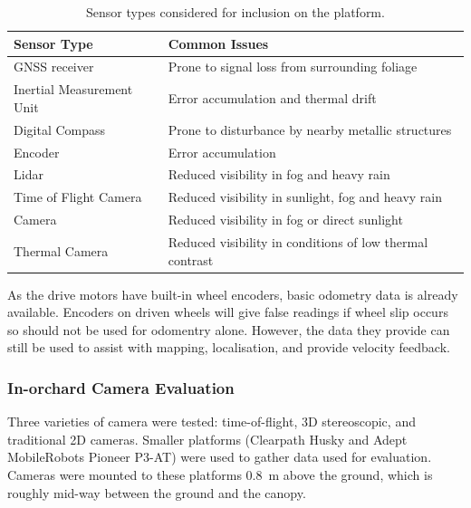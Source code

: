 \documentclass[preprint,authoryear,12pt]{elsarticle}
\begin{document}
    \begin{table}[htbp]
        \centering
        \footnotesize
        \begin{tabular}{ l l}

            \textbf{Sensor Type}      &\textbf{Common Issues} \\ \hline
            GNSS receiver              & Prone to signal loss from surrounding foliage\\  \hline
            Inertial Measurement Unit & Error accumulation and thermal drift\\ \hline
            Digital Compass           & Prone to disturbance by nearby metallic structures\\ \hline
            Encoder                   & Error accumulation \\ \hline
            Lidar                     & Reduced visibility in fog and heavy rain \\ \hline
            Time of Flight Camera     & Reduced visibility in sunlight, fog and heavy rain \\ \hline
            Camera                    & Reduced visibility in fog or direct sunlight \\ \hline
            Thermal Camera            & Reduced visibility in conditions of low thermal contrast\\ \hline
        \end{tabular}
        \caption{Sensor types considered for inclusion on the platform.}
        \label{table:sensor_comparison}
    \end{table}

    As the drive motors have built-in wheel encoders, basic odometry data is already available.
    Encoders on driven wheels will give false readings if wheel slip occurs so should not be used for odomentry alone.
    However, the data they provide can still be used to assist with mapping, localisation, and provide velocity feedback.


    \subsubsection{In-orchard Camera Evaluation}
        \label{sect:camera_evaluation}

        Three varieties of camera were tested: time-of-flight, 3D stereoscopic, and traditional 2D cameras.
        Smaller platforms (Clearpath Husky and Adept MobileRobots Pioneer P3-AT) were used to gather data used for evaluation.
        Cameras were mounted to these platforms \SI{0.8}{\meter} above the ground, which is roughly mid-way between the ground and the canopy.
\end{document}
